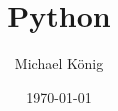 \documentclass[11pt, a4paper]{article}
\title{Python}
\author{Michael König}
\date{\today}
\begin{document}
  \begin{titlingpage}
    \maketitle
    \thispagestyle{firstpage}
    
    \begin{abstract}
      \noindent
    \end{abstract}
  \end{titlingpage}

  \tableofcontents
  \newpage
  \pagestyle{content}
  \setcounter{page}{1}

  
\end{document}
